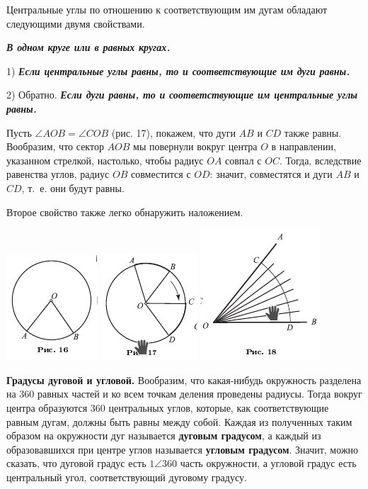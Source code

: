 \documentclass[oneside]{book}
\begin{document}
Центральные углы по отношению к соответствующим им дугам обладают следующими двумя свойствами.

\textbf{\emph{В одном круге или в равных кругах.}}

1) \textbf{\emph{Если центральные углы равны, то и соответствующие им дуги равны.}}

2) Обратно.
\textbf{\emph{Если дуги равны, то и соответствующие им центральные углы равны.}}

Пусть $\angle AOB=\angle COB$ (рис. 17), покажем, что дуги $AB$ и $CD$ также равны.
Вообразим, что сектор $AOB$ мы повернули вокруг центра $O$ в направлении, указанном стрелкой, настолько, чтобы радиус $OA$ совпал с $OC$.
Тогда, вследствие равенства углов, радиус $OB$ совместится с $OD$:
значит, совместятся и дуги $AB$ и $CD$, т.~е.
они будут равны.

Второе свойство также легко обнаружить наложением.

\includegraphics{pics/ris-16}
\includegraphics{pics/ris-17}
\includegraphics{pics/ris-18}

\textbf{Градусы дуговой и угловой.}
Вообразим, что какая-нибудь окружность разделена на 360 равных частей и ко всем точкам деления проведены радиусы.
Тогда вокруг центра образуются 360 центральных углов, которые, как соответствующие равным дугам, должны быть равны между собой.
Каждая из полученных таким образом на окружности дуг называется \textbf{дуговым градусом}, а каждый из образовавшихся при центре углов называется \textbf{угловым градусом}.
Значит, можно сказать, что дуговой градус есть $1\angle 360$ часть окружности, а угловой градус есть центральный угол, соответствующий дуговому градусу.
\end{document}
